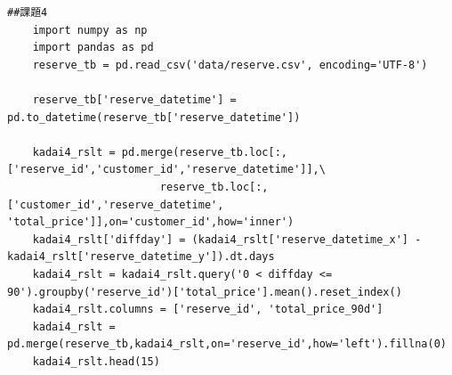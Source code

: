 \documentclass[12pt]{jarticle}
\begin{document}
\begin{lstlisting}[style = py,caption=課題1(2)]
    ##課題4
    import numpy as np
    import pandas as pd
    reserve_tb = pd.read_csv('data/reserve.csv', encoding='UTF-8')
    
    reserve_tb['reserve_datetime'] = pd.to_datetime(reserve_tb['reserve_datetime'])
    
    kadai4_rslt = pd.merge(reserve_tb.loc[:, ['reserve_id','customer_id','reserve_datetime']],\
                        reserve_tb.loc[:, ['customer_id','reserve_datetime', 'total_price']],on='customer_id',how='inner')
    kadai4_rslt['diffday'] = (kadai4_rslt['reserve_datetime_x'] - kadai4_rslt['reserve_datetime_y']).dt.days
    kadai4_rslt = kadai4_rslt.query('0 < diffday <= 90').groupby('reserve_id')['total_price'].mean().reset_index()
    kadai4_rslt.columns = ['reserve_id', 'total_price_90d']
    kadai4_rslt = pd.merge(reserve_tb,kadai4_rslt,on='reserve_id',how='left').fillna(0)
    kadai4_rslt.head(15)
\end{lstlisting}
\end{document}
